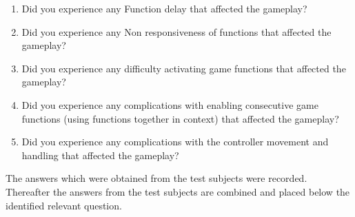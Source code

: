 \begin{enumerate}
\item Did you experience any Function delay that affected the gameplay?
\item Did you experience any Non responsiveness of functions that affected the gameplay?
\item Did you experience any difficulty activating game functions that affected the gameplay?
\item Did you experience any complications with enabling consecutive game functions (using functions together in context) that affected the gameplay? 
\item Did you experience any complications with the controller movement and handling that affected the gameplay?
\end{enumerate}

The answers which were obtained from the test subjects were recorded. 
Thereafter the answers from the test subjects are combined and placed below the identified relevant question.